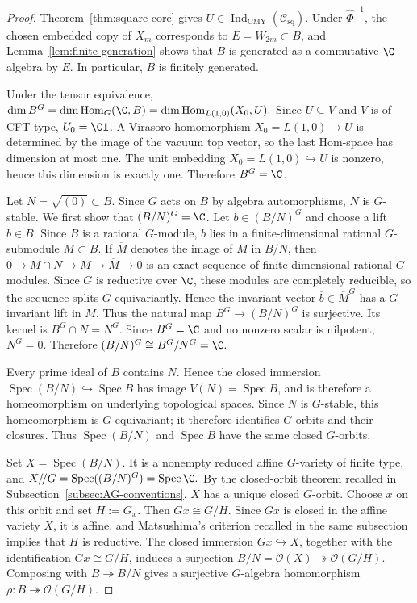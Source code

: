 \documentclass[12pt,leqno]{amsart}
\numberwithin{equation}{section} \newtheorem{thm}{Theorem}[section] \newtheorem{lem}[thm]{Lemma} \newtheorem{ex}[thm]{Example} \newtheorem{prop}[thm]{Proposition} \newtheorem{cor}[thm]{Corollary} \newtheorem{defi}[thm]{Definition} \newtheorem{rmk}[thm]{Remark} \newtheorem{notation}[thm]{Notation}
\newcommand{\one}{\mathbf{1}}
\newcommand{\Spec}{\operatorname{Spec}}
\newcommand{\Hom}{\operatorname{Hom}}
\newcommand{\OO}{\mathcal O}
\newcommand{\Csq}{\mathcal C_{\mathrm{sq}}}
\newcommand{\IndCMY}{\operatorname{Ind}_{\mathrm{CMY}}}
\begin{document}
\begin{proof}
Theorem~\ref{thm:square-core} gives $U\in\IndCMY(\Csq)$. Under \(\widehat\Phi^{-1}\), the chosen embedded copy of $X_m$ corresponds to $E=W_{2m}\subset B$, and Lemma~\ref{lem:finite-generation} shows that $B$ is generated as a commutative $\C$-algebra by $E$. In particular, $B$ is finitely generated.

Under the tensor equivalence, \(\dim B^G=\dim\Hom_G(\C,B)=\dim\Hom_{L(1,0)}(X_0,U).\) Since $U\subseteq V$ and $V$ is of CFT type, $U_0=\C\one$. A Virasoro homomorphism $X_0=L(1,0)\to U$ is determined by the image of the vacuum top vector, so the last Hom-space has dimension at most one. The unit embedding $X_0=L(1,0)\hookrightarrow U$ is nonzero, hence this dimension is exactly one. Therefore \(B^G=\C\).

Let \(N=\sqrt{(0)}\subset B\). Since \(G\) acts on \(B\) by algebra automorphisms, \(N\) is \(G\)-stable. We first show that \((B/N)^G=\C\). Let \(\overline b\in(B/N)^G\) and choose a lift \(b\in B\). Since \(B\) is a rational \(G\)-module, \(b\) lies in a finite-dimensional rational \(G\)-submodule \(M\subset B\). If \(\overline M\) denotes the image of \(M\) in \(B/N\), then \(0\longrightarrow M\cap N\longrightarrow M\longrightarrow\overline M\longrightarrow0\) is an exact sequence of finite-dimensional rational \(G\)-modules. Since \(G\) is reductive over \(\C\), these modules are completely reducible, so the sequence splits \(G\)-equivariantly. Hence the invariant vector \(\overline b\in\overline M^G\) has a \(G\)-invariant lift in \(M\). Thus the natural map \(B^G\to(B/N)^G\) is surjective. Its kernel is \(B^G\cap N=N^G\). Since \(B^G=\C\) and no nonzero scalar is nilpotent, \(N^G=0\). Therefore $ (B/N)^G\cong B^G/N^G=\C. $

Every prime ideal of $B$ contains $N$. Hence the closed immersion $\Spec(B/N)\hookrightarrow\Spec B$ has image $V(N)=\Spec B$, and is therefore a homeomorphism on underlying topological spaces. Since $N$ is $G$-stable, this homeomorphism is $G$-equivariant; it therefore identifies $G$-orbits and their closures. Thus $\Spec(B/N)$ and $\Spec B$ have the same closed $G$-orbits.

Set $X=\Spec(B/N)$. It is a nonempty reduced affine $G$-variety of finite type, and \(X/\!/G=\Spec((B/N)^G)=\Spec\C.\) By the closed-orbit theorem recalled in Subsection~\ref{subsec:AG-conventions}, $X$ has a unique closed $G$-orbit. Choose $x$ on this orbit and set $H:=G_x$. Then $Gx\cong G/H$. Since $Gx$ is closed in the affine variety $X$, it is affine, and Matsushima's criterion recalled in the same subsection implies that $H$ is reductive. The closed immersion $Gx\hookrightarrow X$, together with the identification $Gx\cong G/H$, induces a surjection \(B/N=\OO(X)\twoheadrightarrow\OO(G/H).\) Composing with $B\twoheadrightarrow B/N$ gives a surjective $G$-algebra homomorphism \(\rho:B\twoheadrightarrow\OO(G/H).\)


\end{proof}
\end{document}
